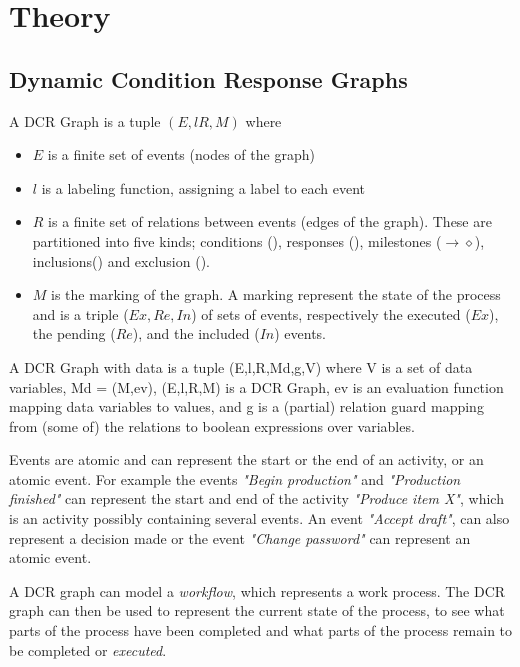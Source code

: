 \chapter{Theory}\label{chap:theory}
	\section{Dynamic Condition Response Graphs}
	
	\begin{definition}
		A DCR Graph is a tuple $(E, l R, M)$ where
		\begin{itemize}
			\item $E$ is a finite set of events (nodes of the graph)
			\item $l$ is a labeling function, assigning a label to each event
			\item $R$ is a finite set of relations between events (edges of the graph). These are partitioned into five kinds; conditions (\condition), responses (\response), milestones ($\rightarrow\!\!\!\diamond$), inclusions(\inclusion) and exclusion (\exclusion).
			\item $M$ is the marking of the graph. A marking represent the state of the process and is a triple ($Ex,Re,In$) of sets of events, respectively the executed ($Ex$), the pending ($Re$), and the included ($In$) events.
		\end{itemize}
		A DCR Graph with data is a tuple (E,l,R,Md,g,V) where V is a set of data variables, Md = (M,ev), (E,l,R,M) is a DCR Graph, ev is an evaluation function mapping data variables to values, and g is a (partial) relation guard mapping from (some of) the relations to boolean expressions over variables.\cite{6975351} 
	\end{definition}

	Events are atomic and can represent the start or the end of an activity, or an atomic event. 
	For example the events \textit{"Begin production"} and \textit{"Production finished"} can represent the start and end of the activity \textit{"Produce item X"}, which is an activity possibly containing several events. An event \textit{"Accept draft"}, can also represent a decision made or the event \textit{"Change password"} can represent an atomic event.
	
	A DCR graph can model a \textit{workflow}, which represents a work process. The DCR graph can then be used to represent the current state of the process, to see what parts of the process have been completed and what parts of the process remain to be completed or \textit{executed}. 
	
